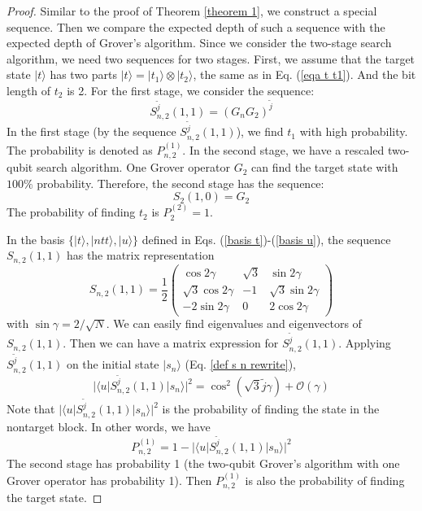 \documentclass[%
 twocolumn,
 10pt,
 superscriptaddress,
 longbibliography,
 amsmath,amssymb,
 aps,
 pra,
floatfix,
]{revtex4-1}
\begin{document}
\begin{proof}
Similar to the proof of Theorem \ref{theorem 1}, we construct a special sequence. Then we compare the expected depth of such a sequence with the expected depth of Grover's algorithm. Since we consider the two-stage search algorithm, we need two sequences for two stages. First, we assume that the target state $|t\rangle$ has two parts $|t\rangle=|t_1\rangle\otimes|t_2\rangle$, the same as in Eq. (\ref{eqa t t1}). And the bit length of $t_2$ is 2. For the first stage, we consider the sequence:
\begin{equation}
    S^{\tilde j}_{n,2}(1,1) = \left(G_nG_2\right)^{\tilde j}
\end{equation}
In the first stage (by the sequence $S^{\tilde j}_{n,2}(1,1)$), we find $t_1$ with high probability. The probability is denoted as $P^{(1)}_{n,2}$. In the second stage, we have a rescaled two-qubit search algorithm. One Grover operator $G_2$ can find the target state with $100\%$ probability. Therefore, the second stage has the sequence:
\begin{equation}
    S_{2}(1,0) = G_2
\end{equation}
The probability of finding $t_2$ is $P^{(2)}_{2}=1$.

In the basis $\{|t\rangle,|ntt\rangle,|u\rangle\}$ defined in Eqs. (\ref{basis t})-(\ref{basis u}), the sequence $S_{n,2}(1,1)$ has the matrix representation
\begin{equation}
S_{n,2}(1,1) = \frac 1 2\left(
\begin{array}{ccc}
 \cos 2\gamma	& \sqrt 3 &  \sin 2\gamma \\ 
\sqrt 3\cos 2\gamma	& -1 & \sqrt 3 \sin 2\gamma \\ 
-2\sin 2\gamma	& 0 & 2\cos 2\gamma
\end{array} 
\right)
\end{equation}
with $\sin \gamma = 2/\sqrt N$. We can easily find eigenvalues and eigenvectors of $S_{n,2}(1,1)$. Then we can have a matrix expression for $S^{\tilde j}_{n,2}(1,1)$. Applying $S^{\tilde j}_{n,2}(1,1)$ on the initial state $|s_n\rangle$ (Eq. \ref{def s n rewrite}), \begin{equation}
	|\langle u|S^{\tilde j}_{n,2}(1,1)|s_n\rangle|^2 = \cos^2(\sqrt 3 \tilde j\gamma)+\mathcal O(\gamma)
\end{equation}
Note that $|\langle u|S^{\tilde j}_{n,2}(1,1)|s_n\rangle|^2$ is the probability of finding the state in the nontarget block. In other words, we have
\begin{equation}
    P^{(1)}_{n,2} = 1-|\langle u|S^{\tilde j}_{n,2}(1,1)|s_n\rangle|^2
\end{equation}
The second stage has probability 1 (the two-qubit Grover's algorithm with one Grover operator has probability 1). Then $P^{(1)}_{n,2}$ is also the probability of finding the target state. 


\end{proof}
\end{document}
